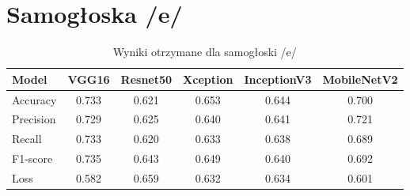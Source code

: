 
\section{Samogłoska /e/}
\label{sec:samogloska-e}

\begin{table}[h]
\centering
\caption{Wyniki otrzymane dla samogłoski /e/}
\label{tab:wyniki-e}
\begin{tabular}{|l|c|c|c|c|c|}
\hline
\textbf{Model} &\textbf{VGG16} &\textbf{Resnet50} &\textbf{Xception} &\textbf{InceptionV3} &\textbf{MobileNetV2} \\ \hline
    Accuracy &0.733 &0.621 &0.653 &0.644 &0.700 \\ \hline
    Precision &0.729 &0.625 &0.640 &0.641 &0.721 \\ \hline
    Recall &0.733 &0.620 &0.633 &0.638 &0.689 \\ \hline
    F1-score &0.735 &0.643 &0.649 &0.640 &0.692 \\ \hline
    Loss &0.582 &0.659 &0.632 &0.634 &0.601 \\ \hline
\end{tabular}
\end{table}


